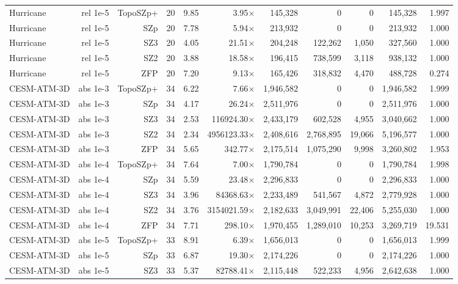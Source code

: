 \begin{tabular}{lrrrrrrrrrr}
Hurricane & rel 1e-5 & TopoSZp+ & 20 & 9.85 & 3.95$\times$ & 145,328 & 0 & 0 & 145,328 & 1.997 \\
Hurricane & rel 1e-5 & SZp & 20 & 7.78 & 5.94$\times$ & 213,932 & 0 & 0 & 213,932 & 1.000 \\
Hurricane & rel 1e-5 & SZ3 & 20 & 4.05 & 21.51$\times$ & 204,248 & 122,262 & 1,050 & 327,560 & 1.000 \\
Hurricane & rel 1e-5 & SZ2 & 20 & 3.88 & 18.58$\times$ & 196,415 & 738,599 & 3,118 & 938,132 & 1.000 \\
Hurricane & rel 1e-5 & ZFP & 20 & 7.20 & 9.13$\times$ & 165,426 & 318,832 & 4,470 & 488,728 & 0.274 \\
CESM-ATM-3D & abs 1e-3 & TopoSZp+ & 34 & 6.22 & 7.66$\times$ & 1,946,582 & 0 & 0 & 1,946,582 & 1.999 \\
CESM-ATM-3D & abs 1e-3 & SZp & 34 & 4.17 & 26.24$\times$ & 2,511,976 & 0 & 0 & 2,511,976 & 1.000 \\
CESM-ATM-3D & abs 1e-3 & SZ3 & 34 & 2.53 & 116924.30$\times$ & 2,433,179 & 602,528 & 4,955 & 3,040,662 & 1.000 \\
CESM-ATM-3D & abs 1e-3 & SZ2 & 34 & 2.34 & 4956123.33$\times$ & 2,408,616 & 2,768,895 & 19,066 & 5,196,577 & 1.000 \\
CESM-ATM-3D & abs 1e-3 & ZFP & 34 & 5.65 & 342.77$\times$ & 2,175,514 & 1,075,290 & 9,998 & 3,260,802 & 1.953 \\
CESM-ATM-3D & abs 1e-4 & TopoSZp+ & 34 & 7.64 & 7.00$\times$ & 1,790,784 & 0 & 0 & 1,790,784 & 1.998 \\
CESM-ATM-3D & abs 1e-4 & SZp & 34 & 5.59 & 23.48$\times$ & 2,296,833 & 0 & 0 & 2,296,833 & 1.000 \\
CESM-ATM-3D & abs 1e-4 & SZ3 & 34 & 3.96 & 84368.63$\times$ & 2,233,489 & 541,567 & 4,872 & 2,779,928 & 1.000 \\
CESM-ATM-3D & abs 1e-4 & SZ2 & 34 & 3.76 & 3154021.59$\times$ & 2,182,633 & 3,049,991 & 22,406 & 5,255,030 & 1.000 \\
CESM-ATM-3D & abs 1e-4 & ZFP & 34 & 7.71 & 298.10$\times$ & 1,970,455 & 1,289,010 & 10,253 & 3,269,719 & 19.531 \\
CESM-ATM-3D & abs 1e-5 & TopoSZp+ & 33 & 8.91 & 6.39$\times$ & 1,656,013 & 0 & 0 & 1,656,013 & 1.999 \\
CESM-ATM-3D & abs 1e-5 & SZp & 33 & 6.87 & 19.30$\times$ & 2,174,226 & 0 & 0 & 2,174,226 & 1.000 \\
CESM-ATM-3D & abs 1e-5 & SZ3 & 33 & 5.37 & 82788.41$\times$ & 2,115,448 & 522,233 & 4,956 & 2,642,638 & 1.000 \\

\end{tabular}
